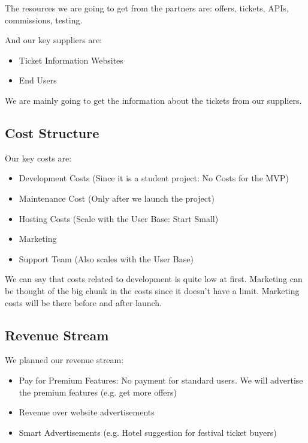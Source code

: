 \documentclass{article}
\begin{document}
The resources we are going to get from the partners are: offers, tickets, APIs, commissions, testing.

And our key suppliers are:
\begin{multicols}{2}
    \begin{itemize}
        \item Ticket Information Websites
        \item End Users
    \end{itemize}
\end{multicols}

We are mainly going to get the information about the tickets from our suppliers.

\vspace{-3mm}
\subsection{Cost Structure}
Our key costs are:
\begin{itemize}
    \item Development Costs (Since it is a student project: No Costs for the MVP)
    \item Maintenance  Cost (Only after we launch the project)
    \item Hosting Costs (Scale with the User Base: Start Small)
    \item Marketing
    \item Support Team (Also scales with the User Base)
\end{itemize}

We can say that costs related to development is quite low at first. Marketing can be thought of the big chunk in the costs since it doesn't have a limit. Marketing costs will be there before and after launch. 

\vspace{-3mm}
\subsection{Revenue Stream}

We planned our revenue stream:
\begin{itemize}
    \item Pay for Premium Features: No payment for standard users. We will advertise the premium features (e.g. get more offers)
    \item Revenue over website advertisements
    \item Smart Advertisements (e.g. Hotel suggestion for festival ticket buyers)
\end{itemize}
\end{document}
